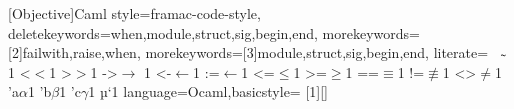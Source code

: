 

[Objective]{Caml}{%
style=framac-code-style,%
deletekeywords={when,module,struct,sig,begin,end},%
morekeywords=[2]{failwith,raise,when},%
morekeywords=[3]{module,struct,sig,begin,end},%
literate=%
{~}{${\scriptstyle\thicksim}$}1%
{<}{$<$}1%
{>}{$>$}1%
{->}{$\rightarrow$ }1%
{<-}{$\leftarrow$}1%
{:=}{$\leftarrow$}1%
{<=}{$\leq$}1%
{>=}{$\geq$}1%
{==}{$\equiv$}1%
{!=}{$\not\equiv$}1%
{<>}{$\neq$}1%
{'a}{$\alpha$}1%
{'b}{$\beta$}1%
{'c}{$\gamma$}1%
{µ}{`{}}1%
}
%
{language=Ocaml,basicstyle=\ifmmode\normalfont\mathtt\scriptstyle\else\normalfont\ttfamily\mdseries\small\fi}
\newcommand{\ocamlinput}[2][]{}
[1][]{\lstset{style=ocaml-basic,#1}}{}
\newcommand{\ocamlinline}[1]{\lstinline[style=ocaml-basic]'#1'}

